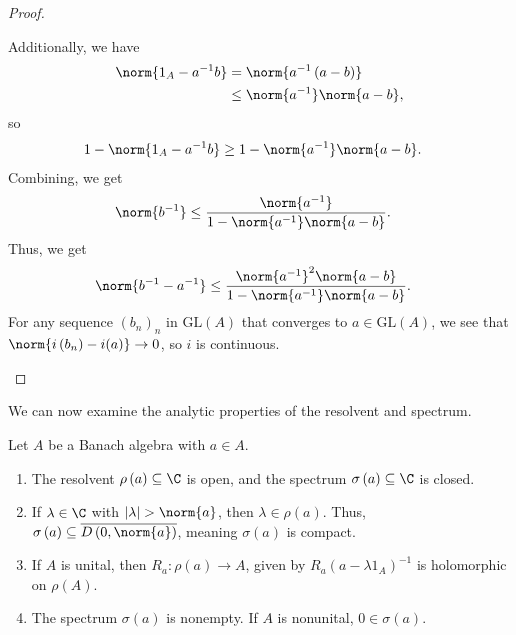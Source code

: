\documentclass[10pt]{mypackage}
\newcommand{\GL}{\text{GL}}
\begin{document}
\begin{proof}
\begin{enumerate}[(1)]
      Additionally, we have
      \begin{align*}
        \norm{1_A - a^{-1}b} &= \norm{a^{-1}\left(a-b\right)}\\
                             &\leq \norm{a^{-1}}\norm{a-b},
      \end{align*}
      so
      \begin{align*}
        1-\norm{1_A - a^{-1}b} &\geq 1-\norm{a^{-1}}\norm{a-b}.
      \end{align*}
      Combining, we get
      \begin{align*}
        \norm{b^{-1}} &\leq \frac{\norm{a^{-1}}}{1-\norm{a^{-1}}\norm{a-b}}.
      \end{align*}
      Thus, we get
      \begin{align*}
        \norm{b^{-1} - a^{-1}} &\leq \frac{\norm{a^{-1}}^2\norm{a-b}}{1-\norm{a^{-1}}\norm{a-b}}.
      \end{align*}
      For any sequence $\left(b_n\right)_n$ in $\GL\left(A\right)$ that converges to $a\in \GL\left(A\right)$, we see that $\norm{i\left(b_n\right) - i(a)}\rightarrow 0$, so $i$ is continuous.
  \end{enumerate}
\end{proof}
We can now examine the analytic properties of the resolvent and spectrum.
\begin{theorem}
  Let $A$ be a Banach algebra with $a\in A$.
  \begin{enumerate}[(1)]
    \item The resolvent $\rho\left(a\right)\subseteq \C$ is open, and the spectrum $\sigma\left(a\right)\subseteq \C$ is closed.
    \item If $\lambda\in \C$ with $\left\vert \lambda \right\vert > \norm{a}$, then $\lambda\in \rho(a)$. Thus, $\sigma\left(a\right)\subseteq \overline{D\left(0,\norm{a}\right)}$, meaning $\sigma\left(a\right)$ is compact.
    \item If $A$ is unital, then $R_a\colon \rho\left(a\right)\rightarrow A$, given by $R_a\left(a-\lambda 1_A\right)^{-1}$ is holomorphic on $\rho\left(A\right)$.
    \item The spectrum $\sigma\left(a\right)$ is nonempty. If $A$ is nonunital, $0\in \sigma\left(a\right)$.
  \end{enumerate}
\end{theorem}
\end{document}
